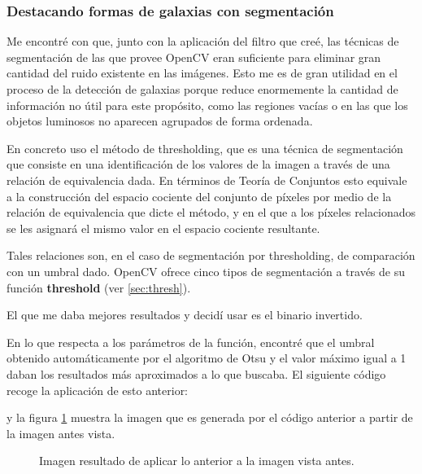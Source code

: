 \documentclass[a4paper,12pt]{article}
\begin{document}
\subsubsection{Destacando formas de galaxias con segmentación}

Me encontré con que, junto con la aplicación del filtro que creé, las técnicas de segmentación de las que provee OpenCV eran suficiente para eliminar gran cantidad del ruido existente en las imágenes. Esto me es de gran utilidad en el proceso de la detección de galaxias porque reduce enormemente la cantidad de información no útil para este propósito, como las regiones vacías o en las que los objetos luminosos no aparecen agrupados de forma ordenada.

En concreto uso el método de thresholding, que es una técnica de segmentación que consiste en una identificación de los valores de la imagen a través de una relación de equivalencia dada. En términos de Teoría de Conjuntos esto equivale a la construcción del espacio cociente del conjunto de píxeles por medio de la relación de equivalencia que dicte el método, y en el que a los píxeles relacionados se les asignará el mismo valor en el espacio cociente resultante.

Tales relaciones son, en el caso de segmentación por thresholding\cite{threshold}, de comparación con un umbral dado. OpenCV ofrece cinco tipos de segmentación a través de su función \textbf{threshold} (ver \ref{sec:thresh}).

El que me daba mejores resultados y decidí usar es el binario invertido.

En lo que respecta a los parámetros de la función, encontré que el umbral obtenido automáticamente por el algoritmo de Otsu\cite{otsu} y el valor máximo igual a 1 daban los resultados más aproximados a lo que buscaba.
El siguiente código recoge la aplicación de esto anterior:

y la figura \ref{fig:img2} muestra la imagen que es generada por el código anterior a partir de la imagen antes vista.

\begin{figure}[!h]
\centering
{}
\caption{Imagen resultado de aplicar lo anterior a la imagen vista antes.}
\label{fig:img2}
\end{figure}
\end{document}
